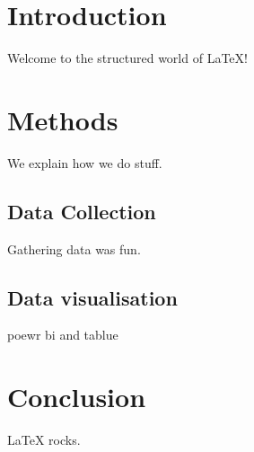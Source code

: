 \documentclass{article}
\begin{document}
\tableofcontents  %
\newpage

\section{Introduction}
Welcome to the structured world of LaTeX!

\section{Methods}
We explain how we do stuff.

\subsection{Data Collection}
Gathering data was fun.

\subsection{Data visualisation}
poewr bi and tablue


\section{Conclusion}
LaTeX rocks.
\end{document}
